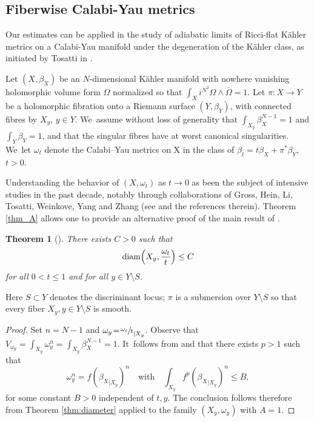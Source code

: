 \documentclass[11pt]{article}
\numberwithin{equation}{section}
\DeclareMathOperator{\diam}{diam}
\newtheorem{theorem}{Theorem}[section]
\theoremstyle{definition}
\begin{document}
\subsection{Fiberwise Calabi-Yau metrics} \label{sec:ke}

Our estimates can be applied in
the study of adiabatic limits of Ricci-flat Kähler metrics on a Calabi-Yau manifold
under the degeneration of the Kähler class, as initiated by Tosatti in \cite{Tos10}.

Let $(X,\beta_X)$ be an $N$-dimensional Kähler manifold with nowhere vanishing holomorphic volume form $\Omega$
normalized so that $\int_X i^{N^2} \Omega \wedge \overline{\Omega}=1$.
Let $\pi:X \rightarrow Y$ be a holomorphic fibration onto a Riemann surface $(Y,\beta_Y)$, with connected fibres
by $X_y$, $y \in Y$. We~assume without loss of generality that $\int_{X_y} \beta_X^{N-1}=1$ and $\int_Y \beta_Y=1$,
and that the singular fibres have at worst canonical singularities. We~let $\omega_t$ denote the Calabi–Yau metrics on X in the class of
$\beta_t=t\beta_X+ \pi^*\beta_Y$, $t>0$.

Understanding the behavior of $(X,\omega_t)$ as $t \rightarrow 0$ as been the subject of intensive studies
in the past decade, notably through collaborations of
Gross, Hein, Li, Tosatti, Weinkove, Yang and Zhang (see \cite{Tos20} and the references therein).
Theorem \ref{thm_A} allows one to provide an alternative proof of the main result of \cite{Li23}.

\begin{theorem}[{\cite[Th.\,1.4]{Li23}}]
There exists $C>0$ such that
\[
\diam \Bigl(X_y, \frac{\omega_t}{t} \Bigr) \leq C
\]
for all $0<t \leq 1$ and for all $y \in Y\setminus S$.
\end{theorem}

Here $S\subset Y$ denotes the discriminant locus; $\pi$ is a submersion over $Y\setminus S$ so that every fiber $X_y, y\in Y\setminus S$ is smooth.

\begin{proof}
Set $n\!=\!N-1$ and $\omega_y\!=\!{{\sfrac{\omega_t}{t}}}_{|X_y}$.
Observe that $V_{\omega_y}\!=\!\int_{X_y} \omega_y^n\!=\!\int_{X_y} \beta_X^{N-1}\!=\!1$. It~follows from \cite[Prop.\,2.3]{Li23} and \cite[Lem.\,4.4]{DnGG23} that there exists $p>1$ such that
\[
\omega_y^n =f ({\beta_X}_{|X_y})^n
\quad \text{with} \quad
\int_{X_y} f^p ({\beta_X}_{|X_y})^n \leq B,
\]
for some constant $B>0$ independent of $t,y$.
The conclusion follows therefore from Theorem \ref{thm:diameter}
applied to the family $(X_y,\omega_y)$ with $A=1$.
\end{proof}
\end{document}
